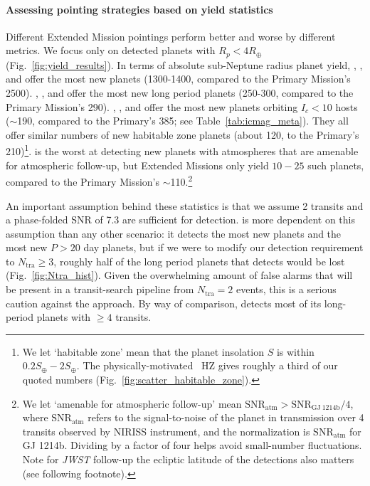 \paragraph{Assessing pointing strategies based on yield statistics} 
Different Extended Mission pointings perform better and worse by different metrics.
We focus only on detected planets with $R_p<4R_\oplus$ (Fig.~\ref{fig:yield_results}).
In terms of absolute sub-Neptune radius planet yield, \hemis, \npole, and \shemiAvoid\:offer the most new planets (1300-1400, compared to the Primary Mission's 2500).
\hemis, \npole, and \npole\:offer the most new long period planets (250-300, compared to the Primary Mission's 290).
\hemis, \shemiAvoid, and \eshort\:offer the most new planets orbiting $I_c<10$ hosts ($\sim$190, compared to the Primary's 385; see Table~\ref{tab:icmag_meta}).
They all offer similar numbers of new habitable zone planets (about 120, to the Primary's 210)\footnote{We let `habitable zone' mean that the planet insolation $S$ is within $0.2S_\oplus-2S_\oplus$. The physically-motivated~\protect\citet{kopparapu_habitable_2013} HZ gives roughly a third of our quoted numbers (Fig.~\protect\ref{fig:scatter_habitable_zone}).}.
\npole\:is the worst at detecting new planets with atmospheres that are amenable for atmospheric follow-up, but Extended Missions only yield $10-25$ such planets, compared to the Primary Mission's $\sim$110.\footnote{We let `amenable for atmospheric follow-up' mean $\mathrm{SNR}_\mathrm{atm} > \mathrm{SNR}_\mathrm{GJ\ 1214b}/4 $, where $\mathrm{SNR}_\mathrm{atm}$ refers to the signal-to-noise of the planet in transmission over 4 transits observed by \jwsts NIRISS instrument, and the normalization is $\mathrm{SNR}_\mathrm{atm}$ for GJ 1214b. Dividing by a factor of four helps avoid small-number fluctuations. Note for \textit{JWST} follow-up the ecliptic latitude of the detections also matters (see following footnote).}

An important assumption behind these statistics is that we assume 2 transits and a phase-folded SNR of 7.3 are sufficient for detection.
\hemis\:is more dependent on this assumption than any other scenario: it detects the most new planets and the most new $P>20$ day planets, but if we were to modify our detection requirement to $N_\mathrm{tra}\geq 3$, roughly half of the long period planets that \hemis\:detects would be lost (Fig.~\ref{fig:Ntra_hist}).
Given the overwhelming amount of false alarms that will be present in a transit-search pipeline from $N_\mathrm{tra} = 2$ events, this is a serious caution against the \hemis\:approach.
By way of comparison, \npole\:detects most of its long-period planets with $\ge 4$ transits.



